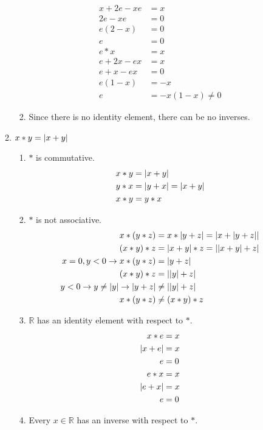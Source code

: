 \begin{enumerate}[label={\Alph*.},font={\bfseries}]
\begin{enumerate}[label={\arabic*},font={\bfseries}]
\begin{enumerate}[label={(\roman*)}]
\begin{align*}
        x+2e-xe &= x \\
        2e-xe &= 0 \\
        e(2-x) &= 0 \\
        e &=0 \\
        e*x &= x \\
        e+2x-ex &= x \\
        e+x-ex &= 0 \\
        e(1-x) &= -x \\
        e &= -x(1-x) \neq 0
      \end{align*}
    \item Since there is no identity element, there can be no inverses.
    \end{enumerate}
  \item $x*y=\lvert x+y\rvert$
    \begin{enumerate}[label={(\roman*)}]
    \item $*$ is commutative.
      \begin{align*}
        x*y &= \lvert x+y\rvert \\
        y*x &= \lvert y+x\rvert = \lvert x+y\rvert \\
        x*y &= y*x
      \end{align*}
    \item $*$ is not associative.
      \begin{align*}
        x*(y*z) &= x*\lvert y+z\rvert = \lvert x+\lvert y+z\rvert\rvert \\
        (x*y)*z &= \lvert x+y\rvert*z = \lvert\lvert x+y\rvert+z\rvert \\
        x=0,y<0 \to x*(y*z) &= \lvert y+z\rvert \\
        (x*y)*z &= \lvert\lvert y\rvert+z\rvert \\
        y<0 \to y \neq \lvert y\rvert \to \lvert y+z\rvert &\neq \lvert\lvert y\rvert+z\rvert\\
        x*(y*z) &\neq (x*y)*z
      \end{align*}
    \item $\mathbb{R}$ has an identity element with respect to $*$.
      \begin{align*}
        x*e &= x \\
        \lvert x+e\rvert &= x \\
        e &= 0 \\
        e*x &= x \\
        \lvert e+x\rvert &= x \\
        e &= 0
      \end{align*}
    \item Every $x\in\mathbb{R}$ has an inverse with respect to $*$.

\end{enumerate}
\end{enumerate}
\end{enumerate}
